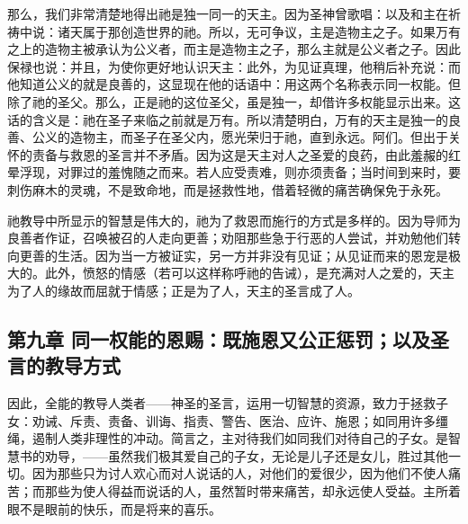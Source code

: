 那么，我们非常清楚地得出祂是独一同一的天主。因为圣神曾歌唱：以及和主在祈祷中说：诸天属于那创造世界的祂。所以，无可争议，主是造物主之子。如果万有之上的造物主被承认为公义者，而主是造物主之子，那么主就是公义者之子。因此保禄也说：并且，为使你更好地认识天主：此外，为见证真理，他稍后补充说：而他知道公义的就是良善的，这显现在他的话语中：用这两个名称表示同一权能。但除了祂的圣父。那么，正是祂的这位圣父，虽是独一，却借许多权能显示出来。这话的含义是：祂在圣子来临之前就是万有。所以清楚明白，万有的天主是独一的良善、公义的造物主，而圣子在圣父内，愿光荣归于祂，直到永远。阿们。但出于关怀的责备与救恩的圣言并不矛盾。因为这是天主对人之圣爱的良药，由此羞赧的红晕浮现，对罪过的羞愧随之而来。若人应受责难，则亦须责备；当时间到来时，要刺伤麻木的灵魂，不是致命地，而是拯救性地，借着轻微的痛苦确保免于永死。\par

祂教导中所显示的智慧是伟大的，祂为了救恩而施行的方式是多样的。因为导师为良善者作证，召唤被召的人走向更善；劝阻那些急于行恶的人尝试，并劝勉他们转向更善的生活。因为当一方被证实，另一方并非没有见证；从见证而来的恩宠是极大的。此外，愤怒的情感（若可以这样称呼祂的告诫），是充满对人之爱的，天主为了人的缘故而屈就于情感；正是为了人，天主的圣言成了人。\par


\subsection{第九章 同一权能的恩赐：既施恩又公正惩罚；以及圣言的教导方式}

因此，全能的教导人类者——神圣的圣言，运用一切智慧的资源，致力于拯救子女：劝诫、斥责、责备、训诲、指责、警告、医治、应许、施恩；如同用许多缰绳，遏制人类非理性的冲动。简言之，主对待我们如同我们对待自己的子女。是智慧书的劝导，——虽然我们极其爱自己的子女，无论是儿子还是女儿，胜过其他一切。因为那些只为讨人欢心而对人说话的人，对他们的爱很少，因为他们不使人痛苦；而那些为使人得益而说话的人，虽然暂时带来痛苦，却永远使人受益。主所着眼不是眼前的快乐，而是将来的喜乐。\par

